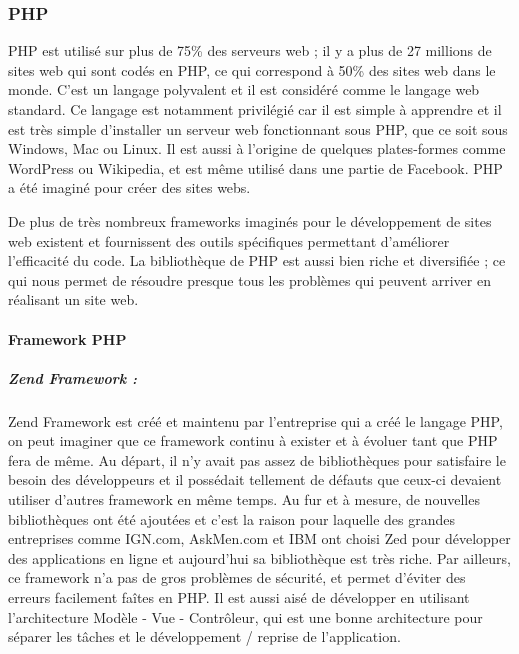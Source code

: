         \subsubsection{PHP}
        \label{subsubsec:php}
        PHP est utilisé sur plus de 75\% des serveurs web ; il y a plus de 27 millions de sites web qui sont codés en PHP,
        ce qui correspond à 50\% des sites web dans le monde. C’est un langage polyvalent et il est considéré comme
        le langage web standard. Ce langage est notamment privilégié car il est simple à apprendre et il est très
        simple d’installer un serveur web fonctionnant sous PHP, que ce soit sous Windows, Mac ou Linux. Il est
        aussi à l’origine de quelques plates-formes comme WordPress ou Wikipedia, et est même utilisé dans une
        partie de Facebook. PHP a été imaginé pour créer des sites webs.

        De plus de très nombreux frameworks imaginés pour le développement de sites web existent et fournissent
        des outils spécifiques permettant d’améliorer l’efficacité du code. La bibliothèque de PHP est aussi bien
        riche et diversifiée ; ce qui nous permet de résoudre presque tous les problèmes qui peuvent arriver
        en réalisant un site web.

        \pagebreak

        \paragraph{Framework PHP}
        \label{par:framworkPHP}

            \subparagraph{Zend Framework :}
            \label{subpar:zend}
            Zend Framework est créé et maintenu par l'entreprise qui a créé le langage PHP, on peut imaginer
            que ce framework continu à exister et à évoluer tant que PHP fera de même. Au départ, il n'y avait
            pas assez de bibliothèques pour satisfaire le besoin des développeurs et il possédait tellement
            de défauts que ceux-ci devaient utiliser d’autres framework en même temps. Au fur et à mesure,
            de nouvelles bibliothèques ont été ajoutées et c'est la raison pour laquelle des grandes entreprises comme IGN.com,
            AskMen.com et IBM ont choisi Zed pour développer des applications en ligne et aujourd’hui  sa bibliothèque
            est très riche. Par ailleurs, ce framework n’a pas de gros problèmes de sécurité, et permet d’éviter
            des erreurs facilement faîtes en PHP. Il est aussi aisé de développer en utilisant l’architecture
            Modèle - Vue - Contrôleur, qui est une bonne architecture pour séparer les tâches et
            le développement / reprise de l’application.


